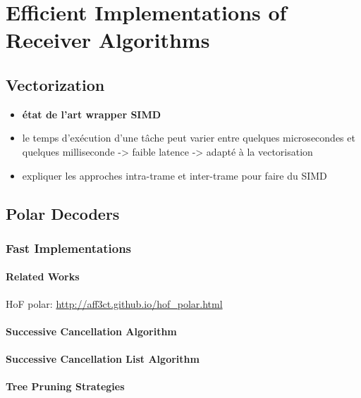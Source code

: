 \chapter{Efficient Implementations of Receiver Algorithms}

\section{Vectorization~\cite{Cassagne2018}}

\begin{itemize}
  \item \textbf{état de l'art wrapper SIMD}
  \item le temps d'exécution d'une tâche peut varier entre quelques
        microsecondes et quelques milliseconde -> faible latence -> adapté à la
        vectorisation
  \item expliquer les approches intra-trame et inter-trame pour faire du SIMD
\end{itemize}

\section{Polar Decoders~\cite{Cassagne2015c,Cassagne2016b,Leonardon2019}}

\subsection{Fast Implementations}

\subsubsection{Related Works}

HoF polar: \url{http://aff3ct.github.io/hof_polar.html}

\subsubsection{Successive Cancellation Algorithm}

\subsubsection{Successive Cancellation List Algorithm}

\subsubsection{Tree Pruning Strategies}

